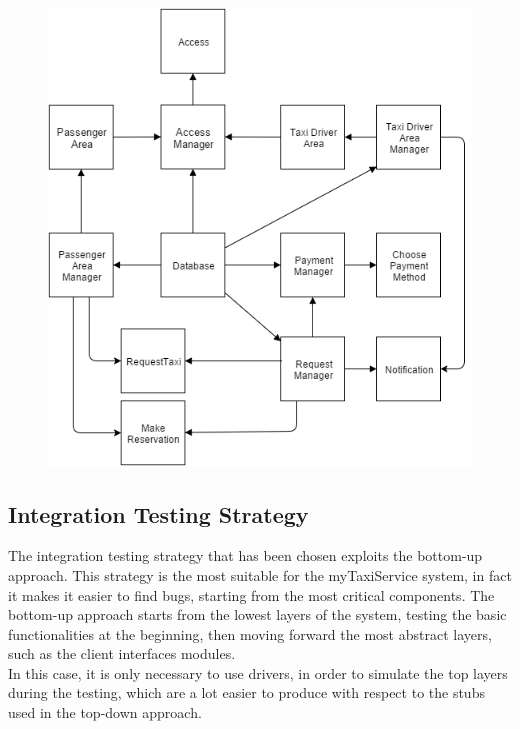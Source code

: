 \documentclass[18pt,oneside,a4paper, titlepage]{article}
\begin{document}
		\begin{figure}[h]
			\centering
			\includegraphics[scale=0.6]{ElementsToBeIntegrated.png}
		\end{figure}
		
		\vspace{0.5cm}
	\subsection{Integration Testing Strategy}
		The integration testing strategy that has been chosen exploits the bottom-up approach. This strategy is the most suitable for the myTaxiService system, in fact it makes it easier to find bugs, starting from the most critical components. The bottom-up approach starts from the lowest layers of the system, testing the basic functionalities at the beginning, then moving forward the most abstract layers, such as the client interfaces modules.\\ In this case, it is only necessary to use drivers, in order to simulate the top layers during the testing, which are a lot easier to produce with respect to the stubs used in the top-down approach.
	\newpage
\end{document}
